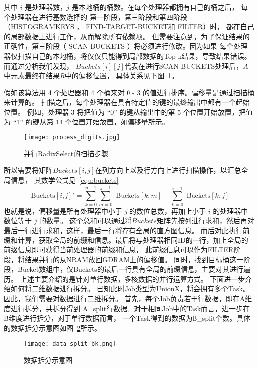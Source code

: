 其中 $i$ 是处理器数，$j$ 是本地桶的桶数。在每个处理器都拥有自己的桶之后，
每个处理器在进行基数选择的
第一阶段，第三阶段和第四阶段（HISTOGRAMKEYS ， FIND-TARGET-BUCKET和 FILTER）时，
都在自己的局部数据上进行工作，从而解除所有依赖项。
但需要注意到，为了保证结果的正确性，第三阶段（ SCAN-BUCKETS ）将必须进行修改。因为如果
每个处理器仅扫描自己的本地桶，将仅仅只能得到局部数据的Top-k结果，导致结果错误。
而通过分析我们发现，
$Buckets[i][j]$代表在进行SCAN-BUCKETS处理后，$A$中元素最终在结果$R$中的偏移位置，
具体关系见下图~\ref{fig:digits}。

假如该算法用 4 个处理器和 4 个桶来对 0 - 3 的值进行排序。偏移量是通过扫描桶来计算的。
扫描之后，每个处理器在具有特定值的键的最终输出中都有一个起始位置。
例如，处理器 3 将把值为 “0” 的键从输出中的第 5 个位置开始放置，把值为 “1” 的键从第 14 个位置开始放置，如偏移量所示。
\begin{figure}[ht]
    \centering
    \texttt{[image: process\_digits.jpg]}
    \caption{并行RadixSelect的扫描步骤}
    \label{fig:digits}
\end{figure}


所以需要将矩阵\(Buckets[i, j]\)在列方向上以及行方向上进行扫描操作，以汇总全局信息，
其数学公式见~\ref{equ:buckets}
\begin{equation}
    \text{ Buckets}[i, j]' = \sum_{k = 0}^{p - 1} \sum_{m = 0}^{j - 1} \text{ Buckets}[k, m] + \sum_{k = 0}^{i - 1} \text{ Buckets}[k, j]
    \label{equ:buckets}
\end{equation}
也就是说，偏移量是所有处理器中小于 $j$ 的数位总数，再加上小于 $i$ 的处理器中数位等于 $j$ 的数量。
这个总和可以通过将$Buckets$矩阵先按列进行求和，然后再对最后一行进行求和，这样，最后一行将存有全局的直方图信息。
而后对此执行前缀和计算，获取全局的前缀和信息。最后将与处理器相同ID的一行，加上全局的前缀信息即可获得当前处理器的前缀和信息，
此前缀信息可以作为FILTER阶段，将结果并行的从NRAM放回GDRAM上的偏移值。
同时，找到目标桶这一阶段，Bucket数组中，仅Buckets的最后一行具有全局的前缀信息，主要对其进行遍历。
上述主要介绍的是针对单行数据，多核数据的并行运算方式。
下面进一步介绍如何将二维数据进行拆分。
已知此时Job类型为UnionX，将会拥有多个Task。因此，我们需要对数据进行二维拆分。
首先，每个Job负责若干行数据，即在A维度进行拆分，共拆分得到
A\_split行数据。对于相同Job中的Task而言，进一步在B维度进行拆分，对于单行数据而言，
一个Task得到的数据为B\_split个数。具体的数据拆分示意图如图~\ref{fig:data_split_bk}所示。

\begin{figure}[ht]
    \centering
    \texttt{[image: data\_split\_bk.png]}
    \caption{数据拆分示意图}
    \label{fig:data_split_bk}
\end{figure}




